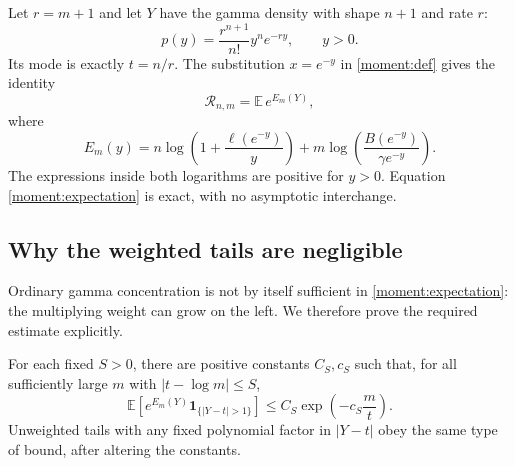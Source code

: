 Let $r=m+1$ and let $Y$ have the gamma density with shape $n+1$ and rate $r$:
\[
 p(y)=\frac{r^{n+1}}{n!}y^n e^{-ry},\qquad y>0.
\]
Its mode is exactly $t=n/r$. The substitution $x=e^{-y}$ in
\eqref{moment:def} gives the identity
\begin{equation}\label{moment:expectation}
 \mathcal R_{n,m}=\mathbb E\,e^{E_m(Y)},
\end{equation}
where
\begin{equation}\label{moment:weight}
 E_m(y)=n\log\left(1+\frac{\ell(e^{-y})}{y}\right)
       +m\log\left(\frac{B(e^{-y})}{\gamma e^{-y}}\right).
\end{equation}
The expressions inside both logarithms are positive for $y>0$.
Equation \eqref{moment:expectation} is exact, with no asymptotic interchange.

\subsection{Why the weighted tails are negligible}
Ordinary gamma concentration is not by itself sufficient in
\eqref{moment:expectation}: the multiplying weight can grow on the left.
We therefore prove the required estimate explicitly.

\begin{lemma}\label{moment:lem:localization}
For each fixed $S>0$, there are positive constants $C_S,c_S$ such that,
for all sufficiently large $m$ with $|t-\log m|\le S$,
\begin{equation}\label{moment:localization}
 \mathbb E\left[e^{E_m(Y)}\mathbf1_{\{|Y-t|>1\}}\right]
 \le C_S\exp\!\left(-c_S\frac m t\right).
\end{equation}
Unweighted tails with any fixed polynomial factor in $|Y-t|$ obey the
same type of bound, after altering the constants.
\end{lemma}

